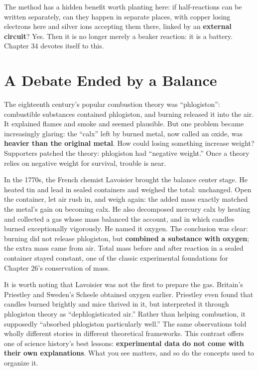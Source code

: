 The method has a hidden benefit worth planting here: if half-reactions can be written separately, can they happen in separate places, with copper losing electrons here and silver ions accepting them there, linked by an \textbf{external circuit}? Yes. Then it is no longer merely a beaker reaction: it is a battery. Chapter 34 devotes itself to this.

\section{A Debate Ended by a Balance}

\begin{zhengju}
The eighteenth century's popular combustion theory was ``phlogiston'': combustible substances contained phlogiston, and burning released it into the air. It explained flames and smoke and seemed plausible. But one problem became increasingly glaring: the ``calx'' left by burned metal, now called an oxide, was \textbf{heavier than the original metal}. How could losing something increase weight? Supporters patched the theory: phlogiston had ``negative weight.'' Once a theory relies on negative weight for survival, trouble is near.

In the 1770s, the French chemist Lavoisier brought the balance center stage. He heated tin and lead in sealed containers and weighed the total: unchanged. Open the container, let air rush in, and weigh again: the added mass exactly matched the metal's gain on becoming calx. He also decomposed mercury calx by heating and collected a gas whose mass balanced the account, and in which candles burned exceptionally vigorously. He named it oxygen. The conclusion was clear: burning did not release phlogiston, but \textbf{combined a substance with oxygen}; the extra mass came from air. Total mass before and after reaction in a sealed container stayed constant, one of the classic experimental foundations for Chapter 26's conservation of mass.

It is worth noting that Lavoisier was not the first to prepare the gas. Britain's Priestley and Sweden's Scheele obtained oxygen earlier. Priestley even found that candles burned brightly and mice thrived in it, but interpreted it through phlogiston theory as ``dephlogisticated air.'' Rather than helping combustion, it supposedly ``absorbed phlogiston particularly well.'' The same observations told wholly different stories in different theoretical frameworks. This contrast offers one of science history's best lessons: \textbf{experimental data do not come with their own explanations}. What you see matters, and so do the concepts used to organize it.


\end{zhengju}

